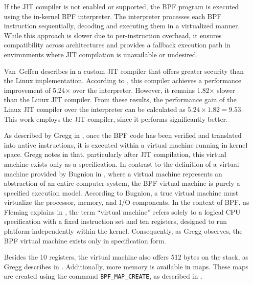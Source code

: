 If the \ac{JIT} compiler is not enabled or supported, the \ac{BPF} program is executed using the in-kernel \ac{BPF} interpreter.  
The interpreter processes each \ac{BPF} instruction sequentially, decoding and executing them in a virtualized manner.  
While this approach is slower due to per-instruction overhead, it ensures compatibility across architectures and provides a fallback execution path in environments where \ac{JIT} compilation is unavailable or undesired.  

Van~Geffen describes in \cite{10.1007/978-3-030-53291-8_29} a custom \ac{JIT} compiler that offers greater security than the Linux implementation.  
According to \cite[p.~566]{10.1007/978-3-030-53291-8_29}, this compiler achieves a performance improvement of 5.24$\times$ over the interpreter.  
However, it remains 1.82$\times$ slower than the Linux \ac{JIT} compiler.  
From these results, the performance gain of the Linux \ac{JIT} compiler over the interpreter can be calculated as $5.24 \times 1.82 = 9.53$.  
This work employs the \ac{JIT} compiler, since it performs significantly better.

As described by Gregg in \cite[Chap.~2.3]{Gregg_2020}, once the \ac{BPF} code has been verified and translated into native instructions, it is executed within a virtual machine running in kernel space.  
Gregg notes in \cite[Chap.~2.3]{Gregg_2020} that, particularly after \ac{JIT} compilation, this virtual machine exists only as a specification.  
In contrast to the definition of a virtual machine provided by Bugnion in \cite{Bugnion2017}, where a virtual machine represents an abstraction of an entire computer system, the \ac{BPF} virtual machine is purely a specified execution model.  
According to Bugnion, a true virtual machine must virtualize the processor, memory, and I/O components.  
In the context of \ac{BPF}, as Fleming explains in \cite{ebpf_intro}, the term “virtual machine” refers solely to a logical \ac{CPU} specification with a fixed instruction set and ten registers, designed to run platform-independently within the kernel.  
Consequently, as Gregg observes, the \ac{BPF} virtual machine exists only in specification form.  

Besides the 10 registers, the virtual machine also offers 512 bytes on the stack, as Gregg describes in \cite[Chap.~2.3]{Gregg_2020}.  
Additionally, more memory is available in maps.  
These maps are created using the command \texttt{BPF\_MAP\_CREATE}, as described in \cite[p.~5]{gbadamosi2024ebpfruntimelinuxkernel}.  

